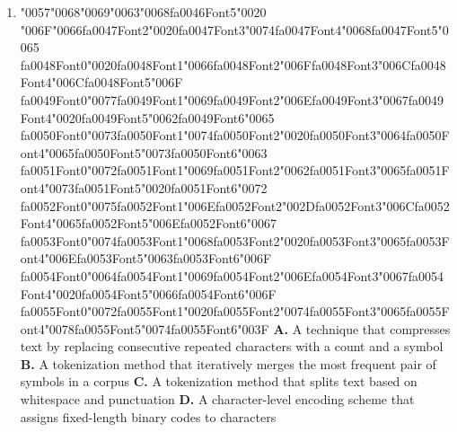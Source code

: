 \documentclass[11pt]{article}
\begin{document}
\begin{enumerate}[leftmargin=*]
  \item {\char"0057}{\char"0068}{\char"0069}{\char"0063}{\char"0068}{\csname fa0046Font5\endcsname\char"0020} {\char"006F}{\char"0066}{\csname fa0047Font2\endcsname\char"0020}{\csname fa0047Font3\endcsname\char"0074}{\csname fa0047Font4\endcsname\char"0068}{\csname fa0047Font5\endcsname\char"0065} {\csname fa0048Font0\endcsname\char"0020}{\csname fa0048Font1\endcsname\char"0066}{\csname fa0048Font2\endcsname\char"006F}{\csname fa0048Font3\endcsname\char"006C}{\csname fa0048Font4\endcsname\char"006C}{\csname fa0048Font5\endcsname\char"006F} {\csname fa0049Font0\endcsname\char"0077}{\csname fa0049Font1\endcsname\char"0069}{\csname fa0049Font2\endcsname\char"006E}{\csname fa0049Font3\endcsname\char"0067}{\csname fa0049Font4\endcsname\char"0020}{\csname fa0049Font5\endcsname\char"0062}{\csname fa0049Font6\endcsname\char"0065} {\csname fa0050Font0\endcsname\char"0073}{\csname fa0050Font1\endcsname\char"0074}{\csname fa0050Font2\endcsname\char"0020}{\csname fa0050Font3\endcsname\char"0064}{\csname fa0050Font4\endcsname\char"0065}{\csname fa0050Font5\endcsname\char"0073}{\csname fa0050Font6\endcsname\char"0063} {\csname fa0051Font0\endcsname\char"0072}{\csname fa0051Font1\endcsname\char"0069}{\csname fa0051Font2\endcsname\char"0062}{\csname fa0051Font3\endcsname\char"0065}{\csname fa0051Font4\endcsname\char"0073}{\csname fa0051Font5\endcsname\char"0020}{\csname fa0051Font6\endcsname\char"0072} {\csname fa0052Font0\endcsname\char"0075}{\csname fa0052Font1\endcsname\char"006E}{\csname fa0052Font2\endcsname\char"002D}{\csname fa0052Font3\endcsname\char"006C}{\csname fa0052Font4\endcsname\char"0065}{\csname fa0052Font5\endcsname\char"006E}{\csname fa0052Font6\endcsname\char"0067} {\csname fa0053Font0\endcsname\char"0074}{\csname fa0053Font1\endcsname\char"0068}{\csname fa0053Font2\endcsname\char"0020}{\csname fa0053Font3\endcsname\char"0065}{\csname fa0053Font4\endcsname\char"006E}{\csname fa0053Font5\endcsname\char"0063}{\csname fa0053Font6\endcsname\char"006F} {\csname fa0054Font0\endcsname\char"0064}{\csname fa0054Font1\endcsname\char"0069}{\csname fa0054Font2\endcsname\char"006E}{\csname fa0054Font3\endcsname\char"0067}{\csname fa0054Font4\endcsname\char"0020}{\csname fa0054Font5\endcsname\char"0066}{\csname fa0054Font6\endcsname\char"006F} {\csname fa0055Font0\endcsname\char"0072}{\csname fa0055Font1\endcsname\char"0020}{\csname fa0055Font2\endcsname\char"0074}{\csname fa0055Font3\endcsname\char"0065}{\csname fa0055Font4\endcsname\char"0078}{\csname fa0055Font5\endcsname\char"0074}{\csname fa0055Font6\endcsname\char"003F}
    \textbf{A.} A technique that compresses text by replacing consecutive repeated characters with a count and a symbol
    \textbf{B.} A tokenization method that iteratively merges the most frequent pair of symbols in a corpus
    \textbf{C.} A tokenization method that splits text based on whitespace and punctuation
    \textbf{D.} A character-level encoding scheme that assigns fixed-length binary codes to characters


\end{enumerate}
\end{document}
